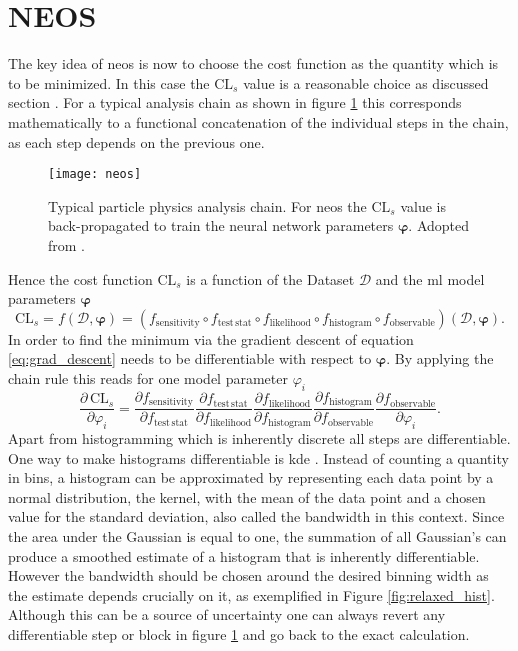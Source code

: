 \section{NEOS}
The key idea of \ac{neos} is now to choose the cost function as the quantity which is to be minimized. In this case the $\mathrm{CL}_s$ value is a reasonable choice as discussed section \red{\ref{sec:statistics}}. For a typical analysis chain as shown in figure \ref{fig:neos} this corresponds mathematically to a functional concatenation of the individual steps in the chain, as each step depends on the previous one.
\begin{figure}
    \centering
    \texttt{[image: neos]}
    \caption[]{Typical particle physics analysis chain. For \ac{neos} the $\text{CL}_s$ value is back-propagated to train the neural network parameters  $\bm{\varphi}$. Adopted from \citep{Simpson_2023}.}
    \label{fig:neos}
\end{figure}
Hence the cost function $\text{CL}_s$ is a function of the Dataset $\mathcal{D}$ and the \ac{ml} model parameters $\bm{\varphi}$
\begin{equation}
    \mathrm{CL}_s = f(\mathcal{D},\bm{\varphi}) = (f_{\mathrm{sensitivity}} \circ f_{\mathrm{test\,stat}} \circ f_{\mathrm{likelihood}}  \circ f_{\mathrm{histogram}}  \circ f_{\mathrm{observable}})(\mathcal{D},\bm{\varphi}).
\end{equation}
In order to find the minimum via the gradient descent of equation \ref{eq:grad_descent} \cls needs to be differentiable with respect to $\bm{\varphi}$. By applying the chain rule this reads for one model parameter $\varphi_i$
\begin{equation}
    \frac{\partial\,\mathrm{CL}_s}{\partial \varphi_i} = \frac{\partial f_{\mathrm{sensitivity}}}{\partial f_{\mathrm{test\,stat}}}\frac{\partial f_{\mathrm{test\,stat}}}{\partial f_{ \mathrm{likelihood}}} \frac{\partial f_{\mathrm{likelihood}}}{\partial f_{\mathrm{histogram}}}   \frac{\partial f_{\mathrm{histogram}}}{\partial f_{\mathrm{observable}}}  \frac{\partial f_{\mathrm{observable}}}{\partial \varphi_i}.
\end{equation}
Apart from histogramming which is inherently discrete all steps are differentiable. One way to make histograms differentiable is \ac{kde} \citep{CRANMER2001198}. Instead of counting a quantity in bins, a histogram can be approximated by representing each data point by a normal distribution, the kernel, with the mean of the data point and a chosen value for the standard deviation, also called the bandwidth in this context. Since the area under the Gaussian is equal to one, the summation of all Gaussian's can produce a smoothed estimate of a histogram that is inherently differentiable. However the bandwidth should be chosen around the desired binning width as the estimate depends crucially on it, as exemplified in Figure \ref{fig:relaxed_hist}. Although this can be a source of uncertainty one can always revert any differentiable step or block in figure \ref{fig:neos} and go back to the exact calculation.
